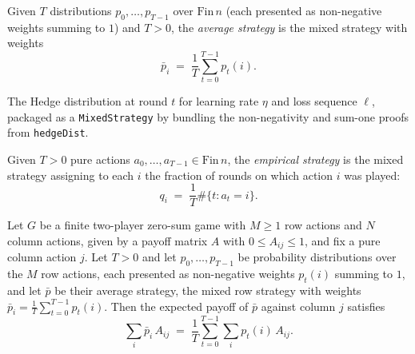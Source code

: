 \begin{definition}
\label{averageStrategy}
\leanok
{}
Given $T$ distributions $p_0, \dots, p_{T-1}$ over $\mathrm{Fin}\,n$ (each
presented as non-negative weights summing to $1$) and $T > 0$, the
\emph{average strategy} is the mixed strategy with weights
\[
  \bar{p}_i \;=\; \frac{1}{T} \sum_{t=0}^{T-1} p_t(i).
\]
\end{definition}

\begin{definition}
\label{hedgeMixedStrategy}
\leanok
{}
The Hedge distribution at round $t$ for learning rate $\eta$ and loss sequence
$\ell$, packaged as a \texttt{MixedStrategy} by bundling the non-negativity and
sum-one proofs from \texttt{hedgeDist}.
\end{definition}

\begin{definition}
\label{empiricalStrategy}
\leanok
{}
Given $T > 0$ pure actions $a_0, \dots, a_{T-1} \in \mathrm{Fin}\,n$, the
\emph{empirical strategy} is the mixed strategy assigning to each $i$ the
fraction of rounds on which action $i$ was played:
\[
  q_i \;=\; \frac{1}{T}\#\{t : a_t = i\}.
\]
\end{definition}

\begin{lemma}
\label{payoffVsPure_averageStrategy}
\leanok
{}
Let $G$ be a finite two-player zero-sum game with $M \ge 1$ row actions and $N$ column
actions, given by a payoff matrix $A$ with $0 \le A_{ij} \le 1$, and fix a pure column
action $j$. Let $T > 0$ and let $p_0, \dots, p_{T-1}$ be probability distributions over
the $M$ row actions, each presented as non-negative weights $p_t(i)$ summing to $1$, and
let $\bar{p}$ be their average strategy, the mixed row strategy with weights $\bar{p}_i
= \frac{1}{T}\sum_{t=0}^{T-1} p_t(i)$. Then the expected payoff of $\bar{p}$ against
column $j$ satisfies
\[
  \sum_{i} \bar{p}_i \, A_{ij}
  \;=\;
  \frac{1}{T} \sum_{t=0}^{T-1} \sum_{i} p_t(i) \, A_{ij}.
\]
\end{lemma}

